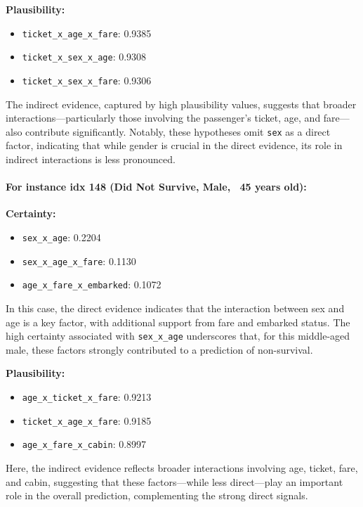 \documentclass[acmlarge]{acmart}
\begin{document}
\textbf{Plausibility:}
\begin{itemize}
    \item \texttt{ticket_x_age_x_fare}: 0.9385
    \item \texttt{ticket_x_sex_x_age}: 0.9308
    \item \texttt{ticket_x_sex_x_fare}: 0.9306
\end{itemize}
The indirect evidence, captured by high plausibility values, suggests that broader interactions—particularly those involving the passenger's ticket, age, and fare—also contribute significantly. Notably, these hypotheses omit \texttt{sex} as a direct factor, indicating that while gender is crucial in the direct evidence, its role in indirect interactions is less pronounced.

\paragraph{For instance idx 148 (Did Not Survive, Male, ~45 years old):} \newline 
\textbf{Certainty:}
\begin{itemize}
    \item \texttt{sex\_x\_age}: 0.2204
    \item \texttt{sex\_x\_age\_x\_fare}: 0.1130
    \item \texttt{age\_x\_fare\_x\_embarked}: 0.1072
\end{itemize}
In this case, the direct evidence indicates that the interaction between sex and age is a key factor, with additional support from fare and embarked status. The high certainty associated with \texttt{sex\_x\_age} underscores that, for this middle-aged male, these factors strongly contributed to a prediction of non-survival.

\textbf{Plausibility:}
\begin{itemize}
    \item \texttt{age\_x\_ticket\_x\_fare}: 0.9213
    \item \texttt{ticket_x_age_x_fare}: 0.9185
    \item \texttt{age\_x\_fare\_x\_cabin}: 0.8997
\end{itemize}
Here, the indirect evidence reflects broader interactions involving age, ticket, fare, and cabin, suggesting that these factors—while less direct—play an important role in the overall prediction, complementing the strong direct signals.
\end{document}
